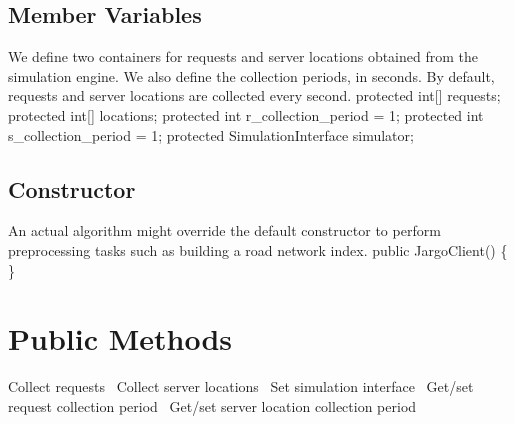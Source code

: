 \documentclass{article}
\def\nwendcode{\endtrivlist \endgroup}
\let\nwdocspar=\par
\begin{document}
\subsection{Member Variables}
We define two containers for requests and server locations obtained from the
simulation engine. We also define the collection periods, in seconds. By
default, requests and server locations are collected every second.
\nwenddocs{}\endmoddef{}
protected int[] requests;
protected int[] locations;
protected int r_collection_period = 1;
protected int s_collection_period = 1;
protected SimulationInterface simulator;
\eatline
{}\nwendcode{}\nwdocspar
\subsection{Constructor}
An actual algorithm might override the default constructor to perform
preprocessing tasks such as building a road network index.
\nwenddocs{}\endmoddef{}
public JargoClient() \{ \}
\nwendcode{}\nwdocspar

\section{Public Methods}
\nwenddocs{}\endmoddef{}
  \LA{}Collect requests~{\nwtagstyle{}}\RA{}
  \LA{}Collect server locations~{\nwtagstyle{}}\RA{}
  \LA{}Set simulation interface~{\nwtagstyle{}}\RA{}
  \LA{}Get/set request collection period~{\nwtagstyle{}}\RA{}
  \LA{}Get/set server location collection period~{\nwtagstyle{}}\RA{}
\nwendcode{}\nwdocspar
\end{document}

